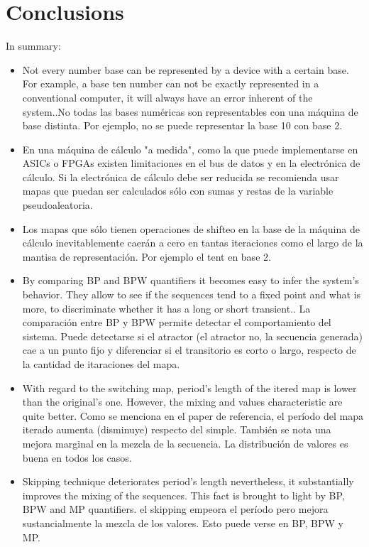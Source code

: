 \section{Conclusions}\label{sec:conclusions}
In summary:
\begin{itemize}
  \item Not every number base can be represented by a device with a certain base. For example, a base ten number can not be exactly represented in a conventional computer, it will always have an error inherent of the system..No todas las bases numéricas son representables con una máquina de base distinta. Por ejemplo, no se puede representar la base 10 con base 2.
  \item En una máquina de cálculo "a medida", como la que puede implementarse en ASICs o FPGAs existen limitaciones en el bus de datos y en la electrónica de cálculo. Si la electrónica de cálculo debe ser reducida se recomienda usar mapas que puedan ser calculados sólo con sumas y restas de la variable pseudoaleatoria.
  \item Los mapas que sólo tienen operaciones de shifteo en la base de la máquina de cálculo inevitablemente caerán a cero en tantas iteraciones como el largo de la mantisa de representación. Por ejemplo el tent en base 2.
  \item By comparing BP and BPW quantifiers it becomes easy to infer the system's behavior. They allow to see if the sequences tend to a fixed point and what is more, to discriminate whether it has a long or short transient.. La comparación entre BP y BPW permite detectar el comportamiento del sistema. Puede detectarse si el atractor (el atractor no, la secuencia generada) cae a un punto fijo y diferenciar si el transitorio es corto o largo, respecto de la cantidad de itaraciones del mapa.
  \item With regard to the switching map, period's length of the itered map is lower than the original's one. However, the mixing and values characteristic are quite better.  Como se menciona en el paper de referencia, el período del mapa iterado aumenta (disminuye) respecto del simple. También se nota una mejora marginal en la mezcla de la secuencia. La distribución de valores es buena en todos los casos.
  \item Skipping technique deteriorates period's length nevertheless, it substantially improves the mixing of the sequences. This fact is brought to light by BP, BPW and MP quantifiers. el skipping empeora el período pero mejora sustancialmente la mezcla de los valores. Esto puede verse en BP, BPW y MP.
\end{itemize}

